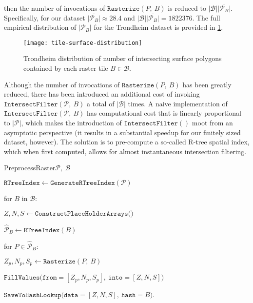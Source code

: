 %
then the number of invocations of $\texttt{Rasterize}(P,~B)$ is reduced to $|\mathcal{B}|\overline{|\mathcal{P}_B|}$.
Specifically, for our dataset $\overline{|\mathcal{P}_B|} \approx \num{28.4}$ and $|\mathcal{B}|\overline{|\mathcal{P}_B|} = \num{1822376}$.
The full empirical distribution of $|\mathcal{P}_B|$ for the Trondheim dataset is provided in \cref{fig:tile-surface-distribution}.
\begin{figure}
  \texttt{[image: tile-surface-distribution]}
  \caption{%
    Trondheim distribution of number of intersecting surface polygons contained by each raster tile $B \in \mathcal{B}$.
  }%
  \label{fig:tile-surface-distribution}
\end{figure}
Although the number of invocations of $\texttt{Rasterize}(P,~B)$ has been greatly reduced, there has been introduced an additional cost of invoking $\texttt{IntersectFilter}(\mathcal{P},~B)$ a total of $|\mathcal{B}|$ times.
A naive implementation of $\texttt{IntersectFilter}(\mathcal{P},~B)$ has computational cost that is linearly proportional to $|\mathcal{P}|$, which makes the introduction of $\texttt{IntersectFilter}()$ moot from an asymptotic perspective (it results in a substantial speedup for our finitely sized dataset, however).
The solution is to pre-compute a so-called R-tree spatial index, which when first computed, allows for almost instantaneous intersection filtering\cite{rtree}.
\begin{pseudofunc}{PreprocessRaster}{$\mathcal{P},~\mathcal{B}$}
  \item $\texttt{RTreeIndex} \leftarrow \texttt{GenerateRTreeIndex}(\mathcal{P})$
  \item for $B$ in $\mathcal{B}$:
  \begin{pseudoloop}
    \item $Z, N, S \leftarrow \texttt{ConstructPlaceHolderArrays()}$
    \item $\hat{\mathcal{P}}_B \leftarrow \texttt{RTreeIndex}(B)$
    \item for $P \in \hat{\mathcal{P}}_B$:
    \begin{pseudoloop}
      \item $Z_p, N_p, S_p \leftarrow \texttt{Rasterize}(P,~B)$
      \item $\texttt{FillValues(from}=[Z_p, N_p, S_p],~\texttt{into}=[Z, N, S])$
    \end{pseudoloop}
    \item $\texttt{SaveToHashLookup(data}=[Z, N, S],~\texttt{hash}=B)$.
  \end{pseudoloop}
\end{pseudofunc}
